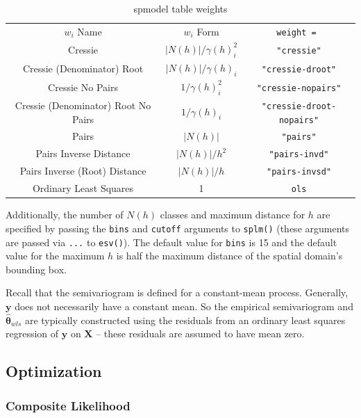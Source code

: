 \documentclass{article}
\begin{document}
\begin{table}\label{tab:weights}
  \centering
  \begin{tabular}{c|c|c}
  \hline
  $w_i$ Name & $w_i$ Form & \texttt{weight = } \\
  Cressie & $|N(h)| / \gamma(h)_i^2$ & \texttt{"cressie"} \\
  Cressie (Denominator) Root & $|N(h)| / \gamma(h)_i$ & \texttt{"cressie-droot"} \\
  Cressie No Pairs & $1 / \gamma(h)_i^2$ & \texttt{"cressie-nopairs"} \\
  Cressie (Denominator) Root No Pairs & $1 / \gamma(h)_i$ & \texttt{"cressie-droot-nopairs"} \\
  Pairs & $|N(h)|$ & \texttt{"pairs"} \\
  Pairs Inverse Distance & $|N(h)| / h^2$ & \texttt{"pairs-invd"} \\
  Pairs Inverse (Root) Distance & $|N(h)| / h$ & \texttt{"pairs-invsd"} \\
  Ordinary Least Squares & 1 & \texttt{ols}
  \end{tabular}
  \caption{spmodel table weights}
\end{table}

Additionally, the number of \(N(h)\) classes and maximum distance for
\(h\) are specified by passing the \texttt{bins} and \texttt{cutoff}
arguments to \texttt{splm()} (these arguments are passed via
\texttt{...} to \texttt{esv()}). The default value for \texttt{bins} is
15 and the default value for the maximum \(h\) is half the maximum
distance of the spatial domain's bounding box.

Recall that the semivariogram is defined for a constant-mean process.
Generally, \(\mathbf{y}\) does not necessarily have a constant mean. So
the empirical semivariogram and \(\bm{\hat{\theta}}_{wls}\) are
typically constructed using the residuals from an ordinary least squares
regression of \(\mathbf{y}\) on \(\mathbf{X}\) -- these residuals are
assumed to have mean zero.

\hypertarget{optimization}{%
\subsection{Optimization}\label{optimization}}

\hypertarget{composite-likelihood}{%
\subsubsection{Composite Likelihood}\label{composite-likelihood}}
\end{document}
